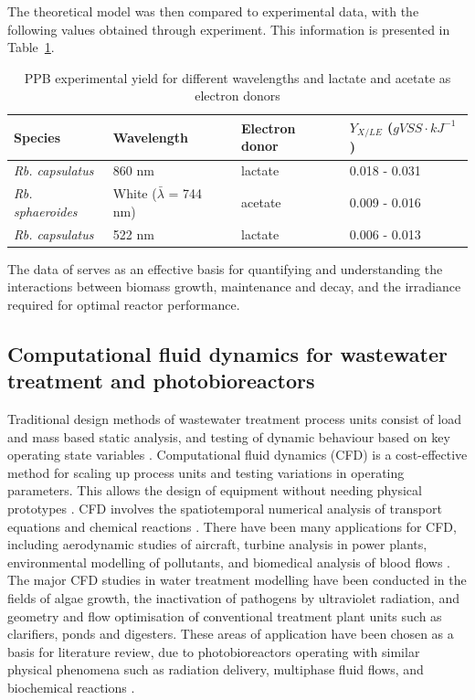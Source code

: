The theoretical model was then compared to experimental data, with the
following values obtained through experiment. This information is
presented in Table~\ref{tab:expQuantum}.

\begin{table}[H]
  \begin{center}
    \caption{PPB experimental yield for different wavelengths and
      lactate and acetate as electron donors\cite{minkevich2004}}
    \label{tab:expQuantum}
    \begin{tabular}{ | l | l | l | l |}
      \hline
      \textbf{Species} & \textbf{Wavelength} & \textbf{Electron donor} & $Y_{X/LE}$ ($gVSS\cdot kJ^{-1}$)\\ \hline \hline
      \textit{Rb. capsulatus} & 860 nm & lactate & 0.018 - 0.031 \\ \hline
      \textit{Rb. sphaeroides} & White ($\bar{\lambda}$ = 744 nm) & acetate & 0.009 - 0.016 \\ \hline
      \textit{Rb. capsulatus} & 522 nm & lactate & 0.006 - 0.013 \\ \hline

    \end{tabular}
  \end{center}
\end{table}
	
The data of \cite{minkevich2004} serves as an effective basis for quantifying and understanding the interactions between biomass growth, maintenance and decay, and the irradiance required for optimal reactor performance.


\subsection{Computational fluid dynamics for wastewater treatment and photobioreactors}
Traditional design methods of wastewater treatment process units consist of load and mass based static analysis, and testing of dynamic behaviour based on key operating state variables \cite{gaden2013}. Computational fluid dynamics (CFD) is a cost-effective method for scaling up process units and testing variations in operating parameters. This allows the design of equipment without needing physical prototypes \cite{wood1995}. CFD involves the spatiotemporal numerical analysis of transport equations and chemical reactions \cite{versteeg2007}. There have been many applications for CFD, including aerodynamic studies of aircraft, turbine analysis in power plants, environmental modelling of pollutants, and biomedical analysis of blood flows \cite{versteeg1995}. The major CFD studies in water treatment modelling have been conducted in the fields of algae growth, the inactivation of pathogens by ultraviolet radiation, and geometry and flow optimisation of conventional treatment plant units such as clarifiers, ponds and digesters. These areas of application have been chosen as a basis for literature review, due to photobioreactors operating with similar physical phenomena such as radiation delivery, multiphase fluid flows, and biochemical reactions \cite{bitog2011}. 

